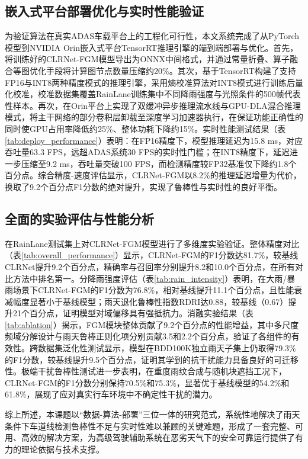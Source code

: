 \subsection{嵌入式平台部署优化与实时性能验证}

为验证算法在真实ADAS车载平台上的工程化可行性，本文系统完成了从PyTorch模型到NVIDIA Orin嵌入式平台TensorRT推理引擎的端到端部署与优化。首先，将训练好的CLRNet-FGM模型导出为ONNX中间格式，并通过常量折叠、算子融合等图优化手段将计算图节点数量压缩约20\%。其次，基于TensorRT构建了支持FP16与INT8两种精度模式的推理引擎，采用熵校准算法对INT8模式进行训练后量化校准，校准数据集覆盖RainLane训练集中不同降雨强度与光照条件的500帧代表性样本。再次，在Orin平台上实现了双缓冲异步推理流水线与GPU-DLA混合推理模式，将主干网络的部分卷积层卸载至深度学习加速器执行，在保证功能正确性的同时使GPU占用率降低约25\%、整体功耗下降约15\%。实时性能测试结果（表\ref{tab:deploy_performance}）表明：在FP16精度下，模型推理延迟为15.8 ms，对应吞吐量63.3 FPS，远超ADAS系统30 FPS的实时性门槛；在INT8精度下，延迟进一步压缩至9.2 ms，吞吐量突破100 FPS，而检测精度较FP32基准仅下降约1.8个百分点。综合精度-速度评估显示，CLRNet-FGM以8.2\%的推理延迟增量为代价，换取了9.2个百分点F1分数的绝对提升，实现了鲁棒性与实时性的良好平衡。

\subsection{全面的实验评估与性能分析}

在RainLane测试集上对CLRNet-FGM模型进行了多维度实验验证。整体精度对比（表\ref{tab:overall_performance}）显示，CLRNet-FGM的F1分数达81.7\%，较基线CLRNet提升9.2个百分点，精确率与召回率分别提升8.2和10.0个百分点，在所有对比方法中排名第一。分降雨强度评估（表\ref{tab:rain_intensity}）表明，在大雨/暴雨场景下CLRNet-FGM的F1分数为76.8\%，相对基线提升11.1个百分点，且性能衰减幅度显著小于基线模型；雨天退化鲁棒性指数RDRI达0.88，较基线（0.67）提升21个百分点，证明模型对域偏移具有强抵抗力。消融实验结果（表\ref{tab:ablation}）揭示，FGM模块整体贡献了9.2个百分点的性能增益，其中多尺度频域分解设计与雨天鲁棒正则化项分别贡献3.5和2.2个百分点，验证了各组件的有效性。跨数据集泛化性测试显示，模型在BDD100K独立雨天子集上仍取得79.3\%的F1分数，较基线提升9.5个百分点，证明其学到的抗干扰能力具备良好的可迁移性。极端干扰鲁棒性测试进一步表明，在重度雨纹合成与随机块遮挡工况下，CLRNet-FGM的F1分数分别保持70.5\%和75.3\%，显著优于基线模型的54.2\%和61.8\%，展现了应对真实行车环境中不确定性干扰的潜力。

综上所述，本课题以“数据-算法-部署”三位一体的研究范式，系统性地解决了雨天条件下车道线检测鲁棒性不足与实时性难以兼顾的关键难题，形成了一套完整、可用、高效的解决方案，为高级驾驶辅助系统在恶劣天气下的安全可靠运行提供了有力的理论依据与技术支撑。

